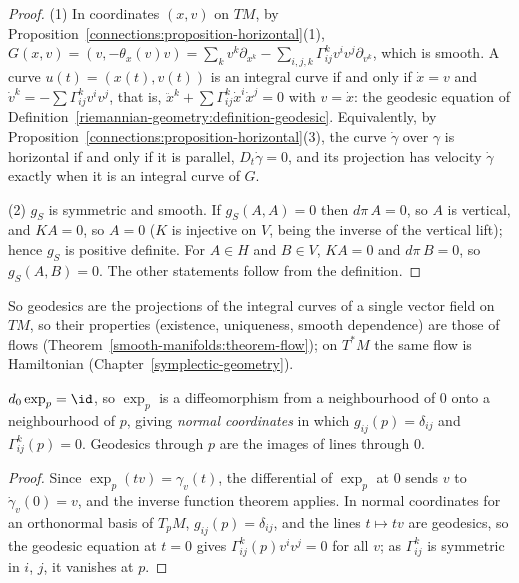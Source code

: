 \begin{proof}
(1) In coordinates $(x, v)$ on $TM$, by Proposition~\ref{connections:proposition-horizontal}(1), $G(x, v) = (v, -\theta_x(v)v) = \sum_kv^k\partial_{x^k} - \sum_{i,j,k}\Gamma^k_{ij}v^iv^j\partial_{v^k}$, which is smooth.
A curve $u(t) = (x(t), v(t))$ is an integral curve if and only if $\dot x = v$ and $\dot v^k = -\sum\Gamma^k_{ij}v^iv^j$, that is, $\ddot x^k + \sum\Gamma^k_{ij}\dot x^i\dot x^j = 0$ with $v = \dot x$: the
geodesic equation of Definition~\ref{riemannian-geometry:definition-geodesic}. Equivalently, by Proposition~\ref{connections:proposition-horizontal}(3), the curve $\dot\gamma$ over $\gamma$ is horizontal if
and only if it is parallel, $D_t\dot\gamma = 0$, and its projection has velocity $\dot\gamma$ exactly when it is an integral curve of $G$.

(2) $g_S$ is symmetric and smooth. If $g_S(A, A) = 0$ then $d\pi\,A = 0$, so $A$ is vertical, and $KA = 0$, so $A = 0$ ($K$ is injective on $V$, being the inverse of the vertical lift); hence $g_S$ is
positive definite. For $A \in H$ and $B \in V$, $KA = 0$ and $d\pi\,B = 0$, so $g_S(A, B) = 0$. The other statements follow from the definition.
\end{proof}

So geodesics are the projections of the integral curves of a single vector field on $TM$, so their properties (existence, uniqueness, smooth
dependence) are those of flows (Theorem~\ref{smooth-manifolds:theorem-flow}); on $T^*M$ the same flow is Hamiltonian (Chapter~\ref{symplectic-geometry}).

\begin{proposition}\label{riemannian-geometry:proposition-exponential}
$d_0\exp_p = \id$, so $\exp_p$ is a diffeomorphism from a neighbourhood of $0$ onto a neighbourhood of $p$, giving \emph{normal coordinates} in which $g_{ij}(p) = \delta_{ij}$ and $\Gamma^k_{ij}(p) = 0$.
Geodesics through $p$ are the images of lines through $0$.
\end{proposition}

\begin{proof}
Since $\exp_p(tv) = \gamma_v(t)$, the differential of $\exp_p$ at $0$ sends $v$ to $\dot\gamma_v(0) = v$, and the inverse function theorem applies. In normal coordinates for an orthonormal basis of $T_pM$, $g_{ij}(p) = \delta_{ij}$, and the lines
$t \mapsto tv$ are geodesics, so the geodesic equation at $t = 0$ gives $\Gamma^k_{ij}(p)v^iv^j = 0$ for all $v$; as $\Gamma^k_{ij}$ is symmetric in $i$, $j$, it vanishes at $p$.
\end{proof}

